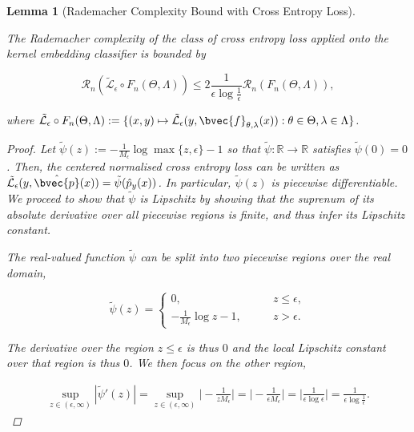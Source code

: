 \documentclass{article}
\newtheorem{lemma}[theorem]{Lemma}
\begin{document}
		\begin{lemma}[Rademacher Complexity Bound with Cross Entropy Loss]
		\label{thm:rademacher_complexity_bound_with_cross_entropy_loss}
		
			The Rademacher complexity of the class of cross entropy loss applied onto the kernel embedding classifier is bounded by
			
			\begin{equation}
				\mathcal{R}_{n}(\tilde{\mathcal{L}}_{\epsilon} \circ F_{n}(\Theta, \Lambda)) \leq 2 \frac{1}{\epsilon \log{\frac{1}{\epsilon}}} \mathcal{R}_{n}(F_{n}(\Theta, \Lambda)),
			\label{eq:composed_rademacher_complexity_bound}
			\end{equation}
			
			where $\tilde{\mathcal{L}}_{\epsilon} \circ F_{n}(\Theta, \Lambda) := \{(x, y) \mapsto \tilde{\mathcal{L}}_{\epsilon}(y, \bvec{f}_{\theta, \lambda}(x)) : \theta \in \Theta, \lambda \in \Lambda\}$.
			
			\begin{proof}
				Let $\tilde{\psi}(z) := - \frac{1}{M_{\epsilon}} \log{\max \{z, \epsilon \}} - 1$ so that $\tilde{\psi} : \mathbb{R} \to \mathbb{R}$ satisfies $\tilde{\psi}(0) = 0$. Then, the centered normalised cross entropy loss can be written as $\tilde{\mathcal{L}}_{\epsilon}(y, \hat{\bvec{p}}(x)) = \tilde{\psi}(\hat{p}_{y}(x))$. In particular, $\tilde{\psi}(z)$ is piecewise differentiable. We proceed to show that $\tilde{\psi}$ is Lipschitz by showing that the suprenum of its absolute derivative over all piecewise regions is finite, and thus infer its Lipschitz constant.
				
				The real-valued function $\tilde{\psi}$ can be split into two piecewise regions over the real domain,
				
				\begin{equation}
					\tilde{\psi}(z) = \begin{cases}
						0, \qquad &z \leq \epsilon, \\
						- \frac{1}{M_{\epsilon}}\log{z} - 1, \qquad &z > \epsilon.
					\end{cases}
				\end{equation}
				
				The derivative over the region $z \leq \epsilon$ is thus $0$ and the local Lipschitz constant over that region is thus $0$. We then focus on the other region,
				
				\begin{equation}
					\begin{aligned}
						\sup_{z \in (\epsilon, \infty)} | \tilde{\psi}'(z) | = \sup_{z \in (\epsilon, \infty)} \Big| - \frac{1}{z M_{\epsilon}} \Big| = \Big| - \frac{1}{\epsilon M_{\epsilon}} \Big| = \Big| \frac{1}{\epsilon \log{\epsilon}} \Big| = \frac{1}{\epsilon \log{\frac{1}{\epsilon}}}.
					\end{aligned}
				\end{equation}
				

\end{proof}
\end{lemma}
\end{document}
